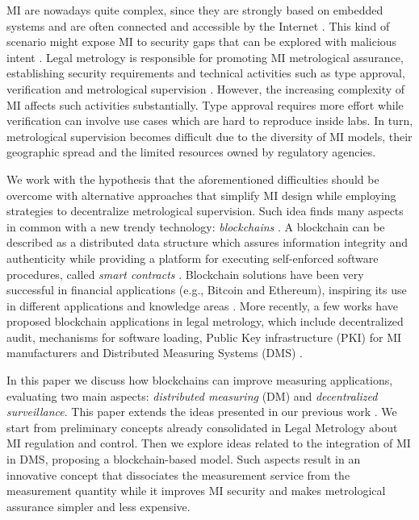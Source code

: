 \documentclass[journal]{IEEEtran}
\begin{document}
MI are nowadays quite complex, since they are strongly based on embedded systems and are often connected and accessible by the Internet \cite{Esche2015,Camara2012}. 
This kind of scenario might expose MI to security gaps that can be explored with malicious intent \cite{Boccardo2014,Peters2015}.
Legal metrology is responsible for promoting MI metrological assurance, establishing security requirements and technical activities such as type approval, verification and metrological supervision \cite{RodriguesFilho2015}.
However, the increasing complexity of MI affects such activities substantially. 
Type approval requires more effort while verification can involve use cases which are hard to reproduce inside labs. 
In turn, metrological supervision becomes difficult due to the diversity of MI models, their geographic spread and the limited resources owned by regulatory agencies.

We work with the hypothesis that the aforementioned difficulties should be overcome with alternative approaches that simplify MI design while employing strategies to decentralize metrological supervision. 
Such idea finds many aspects in common with a new trendy technology: \emph{blockchains} \cite{Nakamoto2008}. 
A blockchain can be described as a distributed data structure which assures information integrity and authenticity while providing a platform for executing self-enforced software procedures, called \emph{smart contracts} \cite{Christidis2016}. Blockchain solutions have been very successful in financial applications (e.g., Bitcoin and Ethereum), inspiring its use in different applications and knowledge areas \cite{Nakamoto2008,Christidis2016}.
More recently, a few works have proposed blockchain applications in legal metrology, which include decentralized audit, mechanisms for software loading, Public Key infrastructure (PKI) for MI manufacturers and Distributed Measuring Systems (DMS) \cite{Peters2018,MeloJr.2018a}.

In this paper we discuss how blockchains can improve measuring applications, evaluating two main aspects: \emph{distributed measuring} (DM) and \emph{decentralized surveillance}.
This paper extends the ideas presented in our previous work \cite{MeloJr.2018a}.
We start from preliminary concepts already consolidated in Legal Metrology about MI regulation and control. 
Then we explore ideas related to the integration of MI in DMS, proposing a blockchain-based model.
Such aspects result in an innovative concept that dissociates the measurement service from the measurement quantity while it improves MI security and makes metrological assurance simpler and less expensive. 
\end{document}
